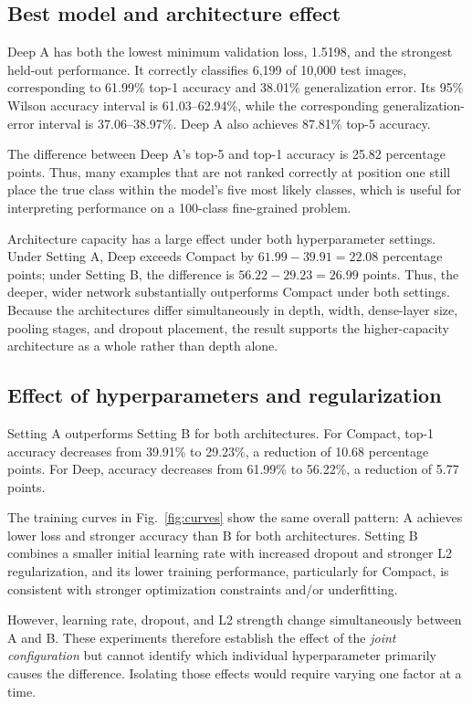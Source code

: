 \documentclass[conference]{IEEEtran}
\begin{document}
\subsection{Best model and architecture effect}

Deep A has both the lowest minimum validation loss, 1.5198, and the strongest held-out performance. It correctly classifies 6,199 of 10,000 test images, corresponding to 61.99\% top-1 accuracy and 38.01\% generalization error. Its 95\% Wilson accuracy interval is 61.03--62.94\%, while the corresponding generalization-error interval is 37.06--38.97\%. Deep A also achieves 87.81\% top-5 accuracy.

The difference between Deep A's top-5 and top-1 accuracy is 25.82 percentage points. Thus, many examples that are not ranked correctly at position one still place the true class within the model's five most likely classes, which is useful for interpreting performance on a 100-class fine-grained problem.

Architecture capacity has a large effect under both hyperparameter settings. Under Setting A, Deep exceeds Compact by $61.99-39.91=22.08$ percentage points; under Setting B, the difference is $56.22-29.23=26.99$ points. Thus, the deeper, wider network substantially outperforms Compact under both settings. Because the architectures differ simultaneously in depth, width, dense-layer size, pooling stages, and dropout placement, the result supports the higher-capacity architecture as a whole rather than depth alone.


\subsection{Effect of hyperparameters and regularization}

Setting A outperforms Setting B for both architectures. For Compact, top-1 accuracy decreases from 39.91\% to 29.23\%, a reduction of 10.68 percentage points. For Deep, accuracy decreases from 61.99\% to 56.22\%, a reduction of 5.77 points.

The training curves in Fig.~\ref{fig:curves} show the same overall pattern: A achieves lower loss and stronger accuracy than B for both architectures. Setting B combines a smaller initial learning rate with increased dropout and stronger L2 regularization, and its lower training performance, particularly for Compact, is consistent with stronger optimization constraints and/or underfitting.

However, learning rate, dropout, and L2 strength change simultaneously between A and B. These experiments therefore establish the effect of the \emph{joint configuration} but cannot identify which individual hyperparameter primarily causes the difference. Isolating those effects would require varying one factor at a time.
\end{document}
